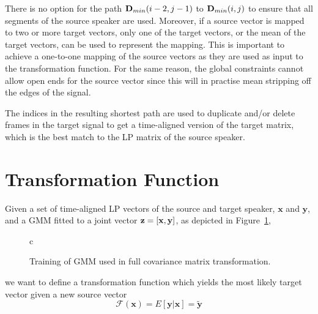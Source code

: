 \begin{remark}
There is no option for the path $\mathbf{D}_{min}(i-2,j-1)$ to $\mathbf{D}_{min}(i,j)$ to ensure that all segments of the source speaker are used. Moreover, if a source vector is mapped to two or more target vectors, only one of the target vectors, or the mean of the target vectors, can be used to represent the mapping. This is important to achieve a one-to-one mapping of the source vectors as they are used as input to the transformation function. For the same reason, the global constraints cannot allow open ends for the source vector since this will in practise mean stripping off the edges of the signal.
\end{remark}

The indices in the resulting shortest path are used to duplicate and/or delete frames in the target signal to get a time-aligned version of the target matrix, which is the best match to the LP matrix of the source speaker.



\section{Transformation Function} %
\label{sec:transformation_function}
Given a set of time-aligned LP vectors of the source and target speaker, $\mathbf{x}$ and $\mathbf{y}$, and a GMM fitted to a joint vector $\mathbf{z}=\left[\mathbf{x},\mathbf{y}\right]$, as depicted in Figure~\ref{fig:VC_training_full},
\begin{figure}[htbp]
	\centering
	\begin{tabular}[h]{c}
	\end{tabular}
	\caption{Training of GMM used in full covariance matrix transformation.}
	\label{fig:VC_training_full}
\end{figure}
we want to define a transformation function which yields the most likely target vector given a new source vector
\newcommand{\fff}{\mathcal F}
\begin{equation}
	\fff(\mathbf{x}) = E[\mathbf{y}\vert \mathbf{x}] = \mathbf{\tilde{y}}
\end{equation}

